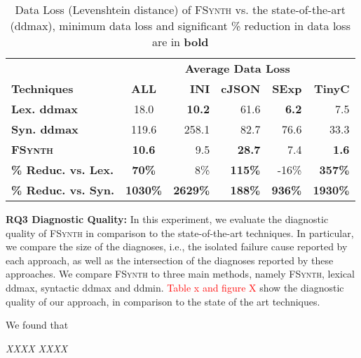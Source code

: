 \documentclass[sigconf,review,anonymous]{acmart}
\newenvironment{result}{\begin{framed}\centering\it}{\end{framed}}
\newcommand{\recheck}[1]{\textcolor{red}{#1}}
\newcommand{\approach}{\textsc{FSynth}\xspace}
\begin{document}
\begin{table}[!tbp]\centering
\caption{Data Loss (Levenshtein distance) of \approach vs. the state-of-the-art (ddmax), minimum data loss and significant \% reduction in data loss are in \textbf{bold}}
\begin{tabular}{|l | c | r  r  r  r |}
\hline
&  \multicolumn{5}{c|}{\textbf{Average Data Loss }}  \\
\textbf{Techniques} & \textbf{ALL} & \textbf{INI} & \textbf{cJSON} & \textbf{SExp} & \textbf{TinyC} \\
\hline
\textbf{Lex. ddmax} & 18.0 & \textbf{10.2} &	61.6 &	\textbf{6.2} &	 7.5 \\	
\textbf{Syn. ddmax} & 119.6 &  258.1 & 82.7 &	76.6 &	33.3 \\
\textbf{\approach} & \textbf{10.6}  & 9.5 &	\textbf{28.7} &	7.4 & \textbf{1.6} \\
\hline
\textbf{\% Reduc. vs. Lex.} & \textbf{70\%} &  8\% & \textbf{115\%} & -16\% & \textbf{357\%} \\
\textbf{\% Reduc. vs. Syn.} & \textbf{1030\%} & \textbf{2629\%} &	\textbf{188\%} & \textbf{936\%} &\textbf{ 1930\%} \\
\hline
\end{tabular}
\label{tab:data-loss}
\end{table}


\noindent
\textbf{RQ3 Diagnostic Quality:}
In this experiment, we evaluate the diagnostic quality of \approach in comparison to the state-of-the-art techniques. In particular, we compare the size of the diagnoses, i.e., the isolated failure cause reported by each approach, as well as the intersection of the diagnoses reported by these approaches. We compare \approach to three main methods, namely \approach, lexical ddmax, syntactic ddmax and ddmin.  \recheck{Table x and figure X} show the diagnostic quality of our approach, in comparison to the state of the art techniques.

We found that

\begin{result}
XXXX
XXXX
\end{result}
\end{document}
